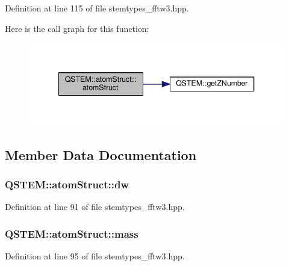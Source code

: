 Definition at line 115 of file stemtypes\-\_\-fftw3.\-hpp.



Here is the call graph for this function\-:
\nopagebreak
\begin{figure}[H]
\begin{center}
\leavevmode
\includegraphics[width=340pt]{struct_q_s_t_e_m_1_1atom_struct_a4709812849cd4e6df9a71cd733884876_cgraph}
\end{center}
\end{figure}




\subsection{Member Data Documentation}
\hypertarget{struct_q_s_t_e_m_1_1atom_struct_abfb39a697cba50d3c9f3da782fe43630}{
\subsubsection[{dw}]{ Q\-S\-T\-E\-M\-::atom\-Struct\-::dw}}\label{struct_q_s_t_e_m_1_1atom_struct_abfb39a697cba50d3c9f3da782fe43630}


Definition at line 91 of file stemtypes\-\_\-fftw3.\-hpp.

\hypertarget{struct_q_s_t_e_m_1_1atom_struct_afc489a4d78aa09cfdacf554f55ad9758}{
\subsubsection[{mass}]{ Q\-S\-T\-E\-M\-::atom\-Struct\-::mass}}\label{struct_q_s_t_e_m_1_1atom_struct_afc489a4d78aa09cfdacf554f55ad9758}


Definition at line 95 of file stemtypes\-\_\-fftw3.\-hpp.

